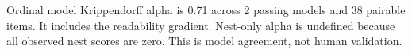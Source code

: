 Ordinal model Krippendorff alpha is 0.71 across 2 passing models and 38 pairable items. It includes the readability gradient. Nest-only alpha is undefined because all observed nest scores are zero. This is model agreement, not human validation.
